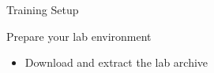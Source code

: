 \setuplabframe
{Training Setup}
{
  Prepare your lab environment
  \begin{itemize}
  \item Download and extract the lab archive
  \end{itemize}
}
